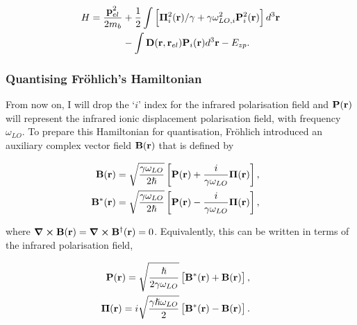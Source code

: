 \begin{equation}
\begin{aligned}
    H = \frac{\vb{p}_{el}^2}{2 m_b} &+ \frac{1}{2} \int \left[\vb{\Pi}_{i}^2(\vb{r})/\gamma + \gamma\omega_{LO, i}^2 \vb{P}^2_i (\vb{r}) \right] d^3 \vb{r} \\
    &- \int \vb{D}(\vb{r},\vb{r}_{el})\vb{P}_i(\vb{r}) d^3\vb{r} - E_{zp} .
\end{aligned}
\label{eqn:frohlich_hamiltonian_slow}
\end{equation}

\subsubsection{Quantising Fr\"ohlich's Hamiltonian}

From now on, I will drop the `$i$' index for the infrared polarisation field and $\vb{P}(\vb{r})$ will represent the infrared ionic displacement polarisation field, with frequency $\omega_{LO}$. To prepare this Hamiltonian for quantisation, Fr\"ohlich introduced an auxiliary complex vector field $\vb{B}(\vb{r})$ that is defined by

\begin{subequations}
\begin{align}
    \begin{split}
    \vb{B}(\vb{r}) &= \sqrt{\frac{\gamma \omega_{LO}}{2\hslash}} \left[ \vb{P}(\vb{r}) + \frac{i}{\gamma\omega_{LO}} \vb{\Pi}(\vb{r})\right],
    \end{split}\\
    \begin{split}
    \vb{B}^*(\vb{r}) &= \sqrt{\frac{\gamma \omega_{LO}}{2\hslash}} \left[ \vb{P}(\vb{r}) - \frac{i}{\gamma\omega_{LO}} \vb{\Pi}(\vb{r})\right],
    \end{split}
\end{align}
\end{subequations}

where $\curl \vb{B}(\vb{r}) = \curl \vb{B}^\dagger(\vb{r}) = 0$. Equivalently, this can be written in terms of the infrared polarisation field,

\begin{subequations}
\begin{align}
    \begin{split}
    \vb{P}(\vb{r}) &= \sqrt{\frac{\hslash}{2\gamma\omega_{LO}}} \left[\vb{B}^*(\vb{r}) + \vb{B}(\vb{r})\right],
    \end{split}\\
    \begin{split}
    \vb{\Pi}(\vb{r}) &= i \sqrt{\frac{\gamma\hslash\omega_{LO}}{2}} \left[\vb{B}^*(\vb{r}) - \vb{B}(\vb{r})\right].
    \end{split}
\end{align}
\end{subequations}

